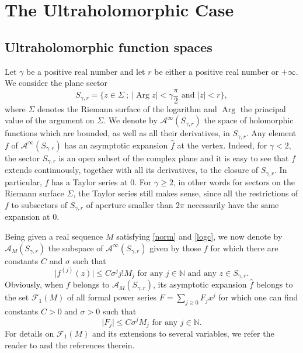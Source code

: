 \documentclass[a4paper]{amsart}
\theoremstyle{plain}
\theoremstyle{remark}
\DeclareMathOperator{\Arg}{Arg}
\begin{document}
\section{The Ultraholomorphic Case}\label{Ult}

\subsection{Ultraholomorphic function spaces}

Let $ \gamma $ be a positive real number and let $ r $ be either a positive real number or $ +\infty $. We consider the plane sector 
\begin{equation*}
S_{\gamma,r}
=\Big\{ z\in\Sigma\ ;\ \vert \Arg z\vert<\gamma\frac{\pi}{2}\textrm{ and }\vert z\vert <r\Big\},
\end{equation*}
where $ \Sigma $ denotes the Riemann surface of the logarithm and $ \Arg $ the principal value of the argument on $ \Sigma $. We denote by $\mathcal{A}^\infty(S_{\gamma,r})$ the space of holomorphic functions which are bounded, as well as all their derivatives, in $ S_{\gamma,r} $. Any element $ f $ of $ \mathcal{A}^\infty(S_{\gamma,r}) $ has an asymptotic expansion $ \widehat{f} $ at the vertex. Indeed, for $ \gamma<2 $, the sector $ S_{\gamma,r} $ is an open subset of the complex plane and it is easy to see that $ f $ extends continuously, together with all its derivatives, to the closure of $ S_{\gamma,r} $. In particular, $ f $ has a Taylor series at $ 0 $. For $ \gamma\geq 2 $, in other words for sectors on the Riemann surface $ \Sigma $, the Taylor series still makes sense, since all the restrictions of $ f $ to subsectors of $ S_{\gamma,r} $ of aperture smaller than $ 2\pi $ necessarily have the same expansion at $ 0 $.

Being given a real sequence $ M $ satisfying \eqref{norm} and \eqref{logc}, we now denote by $ \mathcal{A}_M(S_{\gamma,r}) $ the subspace of $ \mathcal{A}^\infty(S_{\gamma,r}) $ given by those $ f $ for which there are constants $ C $ and $ \sigma $ such that 
\begin{equation*}
\vert f^{(j)}(z)\vert\leq C\sigma^j j!M_j\text{ for any }j \in\mathbb{N}\text{ and any }z\in S_{\gamma,r}.
\end{equation*}
Obviously, when $ f $ belongs to $ \mathcal{A}_M(S_{\gamma,r})$, its asymptotic expansion $ \widehat{f} $ belongs to the set $\mathcal{F}_1(M) $ of all formal power series $ F=\sum_{j\geq 0}F_jx^j $ for which one can find constants $ C>0 $ and $ \sigma >0 $ such that 
\begin{equation*}
\vert F_j\vert\leq C\sigma^j M_j \text{ for any } j\in \mathbb{N}.
\end{equation*}
For details on $ \mathcal{F}_1(M) $ and its extensions to several variables, we refer the reader to \cite{Th} and the references therein. 
\end{document}

